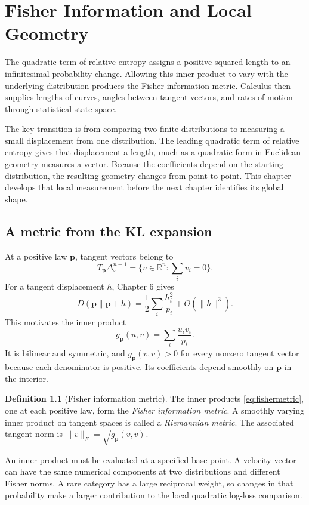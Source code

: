 \documentclass[11pt,oneside,openany]{book}
\theoremstyle{definition}
\newtheorem{definition}[theorem]{Definition}
\theoremstyle{remark}
\newcommand{\R}{\mathbb{R}}
\newcommand{\p}{\mathbf{p}}
\numberwithin{equation}{chapter}
\begin{document}
\mainmatter
\setcounter{chapter}{6}
\chapter{Fisher Information and Local Geometry}
\label{ch:fisher}

The quadratic term of relative entropy assigns a positive squared length to an infinitesimal probability change. Allowing this inner product to vary with the underlying distribution produces the Fisher information metric. Calculus then supplies lengths of curves, angles between tangent vectors, and rates of motion through statistical state space.

The key transition is from comparing two finite distributions to measuring a small displacement from one distribution. The leading quadratic term of relative entropy gives that displacement a length, much as a quadratic form in Euclidean geometry measures a vector. Because the coefficients depend on the starting distribution, the resulting geometry changes from point to point. This chapter develops that local measurement before the next chapter identifies its global shape.

\section{A metric from the KL expansion}
At a positive law $\p$, tangent vectors belong to
\[
T_\p\Delta^{n-1}_{\!\circ}=\{v\in\R^n:\sum_i v_i=0\}.
\]
For a tangent displacement $h$, Chapter 6 gives
\[
D(\p\|\p+h)=\frac12\sum_i\frac{h_i^2}{p_i}+O(\|h\|^3).
\]
This motivates the inner product
\begin{equation}\label{eq:fishermetric}
\boxed{g_\p(u,v)=\sum_i\frac{u_iv_i}{p_i}.}
\end{equation}
It is bilinear and symmetric, and $g_\p(v,v)>0$ for every nonzero tangent vector because each denominator is positive. Its coefficients depend smoothly on $\p$ in the interior.

\begin{definition}[Fisher information metric]
The inner products \eqref{eq:fishermetric}, one at each positive law, form the \emph{Fisher information metric}. A smoothly varying inner product on tangent spaces is called a \emph{Riemannian metric}. The associated tangent norm is $\|v\|_F=\sqrt{g_\p(v,v)}$.
\end{definition}

An inner product must be evaluated at a specified base point. A velocity vector can have the same numerical components at two distributions and different Fisher norms. A rare category has a large reciprocal weight, so changes in that probability make a larger contribution to the local quadratic log-loss comparison.
\end{document}

